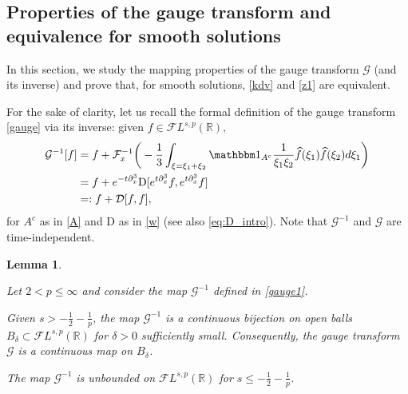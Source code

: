 \documentclass[%
11pt,  reqno]{amsart}
\newcommand{\5}{\textup{V}}
\newcommand{\noi}{\noindent}
\newcommand{\FL}{\mathcal{F} L}
\newcommand{\ft}{\widehat}
\newcommand{\ind}{\mathbbm 1}
\newcommand{\dl}{\delta}
\newcommand{\dx}{\partial_x}
\newtheorem{lemma}[theorem]{Lemma}
\theoremstyle{remark}
\newcommand{\R}{\mathbb{R}}
\newcommand{\Ft}{{\mathcal{F}}}
\newcommand{\Gc}{\mathcal{G}}
\numberwithin{equation}{section}
\numberwithin{theorem}{section}
\newcommand{\D}{\mathrm{D}}
\newcommand{\DD}{\mathcal{D}}
\newcommand{\andreia}[1]{\marginpar{\color{purple} $\Leftarrow\Leftarrow\Leftarrow$}{\smallskip \noi\color{purple}ANDREIA: #1}\smallskip}
\begin{document}
\subsection{Properties of the gauge transform and equivalence for smooth solutions}\label{sec:gauge_prop}
In this section, we study the mapping properties of the gauge transform $\Gc$ (and its inverse) and prove that, for smooth solutions, \eqref{kdv} and \eqref{z1} are equivalent.

For the sake of clarity, let us recall the formal definition of the gauge transform \eqref{gauge} via its inverse: given
$f \in \FL^{s,p}(\R)$,
\begin{align}\label{gauge1}
    \Gc^{-1}[f] 
    &
    = f + \Ft_x^{-1}\bigg( - \frac{1}{3} \int_{\xi=\xi_1+\xi_2} \ind_{A^c} \frac{1}{\xi_1\xi_2} \ft{f}(\xi_1) \ft{f}(\xi_2) d\xi_1 \bigg)\\&=f + e^{-t\dx^3} \D[e^{t\dx^3} f , e^{t\dx^3}f]
    \\
    &
     =: f + \DD [f, f]
    ,
\end{align}
for $A^c$ as in \eqref{A} and $\D$ as in \eqref{w} (see also \eqref{eq:D_intro}).
Note that $\Gc^{-1}$ and  $\Gc$ are time-independent. 

 



\begin{lemma}\label{LEM:D}

Let $2<p\le \infty$ and consider the map  $\Gc^{-1}$ defined in \eqref{gauge1}.

\smallskip

\noi {\rm(i)}
Given $s>-\frac12 - \frac1p$, the map  $\Gc^{-1}$ is a continuous bijection on open balls $B_\dl \subset  \FL^{s,p}(\R)$ for $\dl>0$ sufficiently small. 
Consequently, the gauge transform $\Gc$ is a continuous map on $B_\dl$. 

\smallskip
\noi {\rm(ii)} The map $\Gc^{-1}$ is unbounded on $\FL^{s,p}(\R)$ for $s\le - \frac12 - \frac1p$. 

    
\end{lemma}
\end{document}
